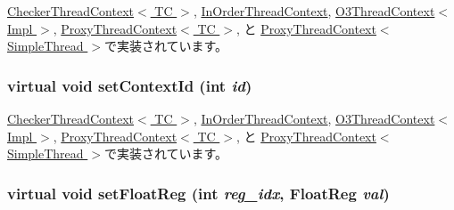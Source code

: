 \hyperlink{classCheckerThreadContext_a6dec2284dd5904f992642f24bb289f14}{CheckerThreadContext$<$ TC $>$}, \hyperlink{classInOrderThreadContext_a6dec2284dd5904f992642f24bb289f14}{InOrderThreadContext}, \hyperlink{classO3ThreadContext_a6dec2284dd5904f992642f24bb289f14}{O3ThreadContext$<$ Impl $>$}, \hyperlink{classProxyThreadContext_a6dec2284dd5904f992642f24bb289f14}{ProxyThreadContext$<$ TC $>$}, と \hyperlink{classProxyThreadContext_a6dec2284dd5904f992642f24bb289f14}{ProxyThreadContext$<$ SimpleThread $>$}で実装されています。\hypertarget{classThreadContext_a60a9383e4a460807756f2de9f5215582}{
\subsubsection[{setContextId}]{\setlength{\rightskip}{0pt plus 5cm}virtual void setContextId (int {\em id})}}
\label{classThreadContext_a60a9383e4a460807756f2de9f5215582}


\hyperlink{classCheckerThreadContext_a0dd10037a5b0eadaddfe7c67d52d3ac6}{CheckerThreadContext$<$ TC $>$}, \hyperlink{classInOrderThreadContext_a0dd10037a5b0eadaddfe7c67d52d3ac6}{InOrderThreadContext}, \hyperlink{classO3ThreadContext_a5dddb107b15d8fe6fc941ed0b9654fd2}{O3ThreadContext$<$ Impl $>$}, \hyperlink{classProxyThreadContext_a0dd10037a5b0eadaddfe7c67d52d3ac6}{ProxyThreadContext$<$ TC $>$}, と \hyperlink{classProxyThreadContext_a0dd10037a5b0eadaddfe7c67d52d3ac6}{ProxyThreadContext$<$ SimpleThread $>$}で実装されています。\hypertarget{classThreadContext_af8dc9762fda519d911372dd6f4a28d8e}{
\subsubsection[{setFloatReg}]{\setlength{\rightskip}{0pt plus 5cm}virtual void setFloatReg (int {\em reg\_\-idx}, \/  {\bf FloatReg} {\em val})}}
\label{classThreadContext_af8dc9762fda519d911372dd6f4a28d8e}


